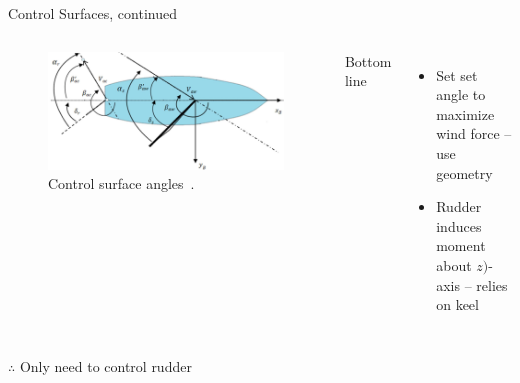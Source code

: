 \documentclass[10pt,xcolor={table,dvipsnames},t]{beamer}
\begin{document}
\begin{frame}{Control Surfaces, continued}
    \begin{columns}
    \begin{figure}
        \centering
        \includegraphics{documents/figures/alves_sailboat_angles.png}
        \caption{Control surface angles~\cite{Alves2010}.}
        \label{fig:my_label}
    \end{figure}
    \centerline{Bottom line}
    \begin{itemize}
        \item Set set angle to maximize wind force -- use geometry
        \item Rudder induces moment about \(z)\)-axis -- relies on keel
    \end{itemize}

    \end{columns}
    \centerline{\(\therefore\) Only need to control rudder}
\end{frame}
\end{document}
